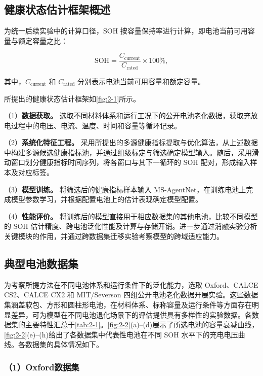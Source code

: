 \subsection{健康状态估计框架概述}

为统一后续实验中的计算口径，SOH 按容量保持率进行计算，即电池当前可用容量与额定容量之比\cite{ref13,ref14}：

\begin{equation}
\mathrm{SOH}=\frac{C_{\mathrm{current}}}{C_{\mathrm{rated}}}\times100\%,
\end{equation}

其中，$C_{\mathrm{current}}$ 和 $C_{\mathrm{rated}}$ 分别表示电池当前可用容量和额定容量。

所提出的健康状态估计框架如\cref{fig:2-1}所示。

（1）\textbf{数据获取。} 选取不同材料体系和运行工况下的公开电池老化数据，获取充放电过程中的电压、电流、温度、时间和容量等循环记录。

（2）\textbf{系统化特征工程。} 采用所提出的多源健康指标提取与优化算法，从上述数据中构建多源候选健康指标池，并通过组级标定与筛选确定模型输入。随后，采用滑动窗口划分健康指标时间序列，将各窗口与其下一循环的 SOH 配对，形成输入样本及对应标签。

（3）\textbf{模型训练。} 将筛选后的健康指标样本输入 MS-AgentNet，在训练电池上完成模型参数学习，并根据配置电池上的估计表现确定模型配置。

（4）\textbf{性能评价。} 将训练后的模型直接用于相应数据集的其他电池，比较不同模型的 SOH 估计精度、跨电池泛化性能及计算与存储开销。进一步通过消融实验分析关键模块的作用，并通过跨数据集迁移实验考察模型的跨域适应能力。

\subsection{典型电池数据集}

为考察所提方法在不同电池体系和运行条件下的泛化能力，选取 Oxford、CALCE CS2、CALCE CX2 和 MIT/Severson 四组公开电池老化数据开展实验。这些数据集涵盖软包、方形和圆柱形电池，在材料体系、标称容量及运行条件等方面存在明显差异，可为模型在不同电池退化场景下的评估提供具有多样性的实验数据。各数据集的主要特性汇总于\cref{tab:2-1}。\cref{fig:2-2}(a)--(d)展示了所选电池的容量衰减曲线，\cref{fig:2-2}(e)--(h)给出了各数据集中代表性电池在不同 SOH 水平下的充电电压曲线。各数据集的具体情况如下。



\subsubsection*{（1）Oxford数据集}

